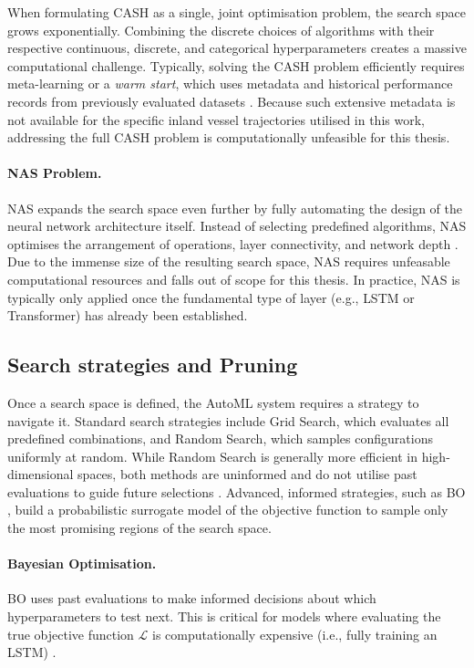When formulating \ac{CASH} as a single, joint optimisation problem, the search space grows exponentially. Combining the discrete choices of algorithms with their respective continuous, discrete, and categorical hyperparameters creates a massive computational challenge. Typically, solving the \ac{CASH} problem efficiently requires meta-learning or a \emph{warm start}, which uses metadata and historical performance records from previously evaluated datasets \parencite{AutoMLHoos}. Because such extensive metadata is not available for the specific inland vessel trajectories utilised in this work, addressing the full \ac{CASH} problem is computationally unfeasible for this thesis. %


\paragraph{NAS Problem.} 
\acf{NAS} expands the search space even further by fully automating the design of the neural network architecture itself. Instead of selecting predefined algorithms, \ac{NAS} optimises the arrangement of operations, layer connectivity, and network depth \parencite{AutoMLHoos}. Due to the immense size of the resulting search space, \ac{NAS} requires unfeasable computational resources and falls out of scope for this thesis. In practice, \ac{NAS} is typically only applied once the fundamental type of layer (e.g., \ac{LSTM} or Transformer) has already been established.


\subsection{Search strategies and Pruning}
Once a search space is defined, the \ac{AutoML} system requires a strategy to navigate it. Standard search strategies include Grid Search, which evaluates all predefined combinations, and Random Search, which samples configurations uniformly at random. While Random Search is generally more efficient in high-dimensional spaces, %
both methods are uninformed and do not utilise past evaluations to guide future selections \parencite{hutter2019automated}. Advanced, informed strategies, such as \acf{BO} , build a probabilistic surrogate model of the objective function to sample only the most promising regions of the search space. 


\paragraph{Bayesian Optimisation.}
\acf{BO} uses past evaluations to make informed decisions about which hyperparameters to test next. This is critical for models where evaluating the true objective function $\mathcal{L}$ is computationally expensive (i.e., fully training an \ac{LSTM}) \parencite{hutter2019automated}.

